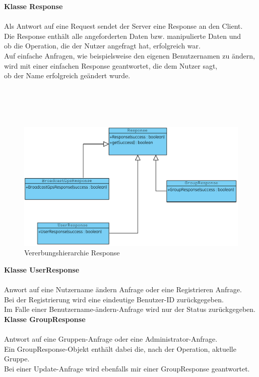 \newpage
\textbf{Klasse Response}\\
\\
Als Antwort auf eine Request sendet der Server eine Response an den Client.\\
Die Response enthält alle angeforderten Daten bzw. manipulierte Daten und \\
ob die Operation, die der Nutzer angefragt hat, erfolgreich war.\\
Auf einfache Anfragen, wie beispielsweise den eigenen Benutzernamen zu ändern,\\
wird mit einer einfachen Response geantwortet, die dem Nutzer sagt,\\
ob der Name erfolgreich geändert wurde.\\
\\ \\ \\ \\

\begin{figure}[h]
     \hspace*{-2cm}\includegraphics[scale=1.0]{servergraphs/communication-response.pdf}
     \caption{Vererbungshierarchie Response}
\end{figure}
\clearpage

\textbf{Klasse UserResponse}\\
\\
Anwort auf eine Nutzername ändern Anfrage oder eine Registrieren Anfrage.\\
Bei der Registrierung wird eine eindeutige Benutzer-ID zurückgegeben.\\
Im Falle einer Benutzername-ändern-Anfrage wird nur der Status zurückgegeben.\\

\textbf{Klasse GroupResponse}\\
\\
Antwort auf eine Gruppen-Anfrage oder eine Administrator-Anfrage.\\
Ein GroupResponse-Objekt enthält dabei die, nach der Operation, aktuelle Gruppe.\\
Bei einer Update-Anfrage wird ebenfalls mir einer GroupResponse geantwortet.\\

